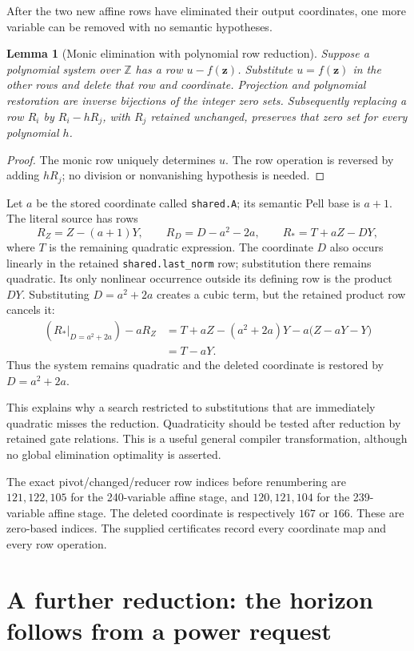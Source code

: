 \documentclass[11pt]{article}
\newcommand{\Z}{\mathbb Z}
\newcommand{\file}[1]{\nolinkurl{#1}}
\newtheorem{lemma}[theorem]{Lemma}
\theoremstyle{remark}\newtheorem{remark}[theorem]{Remark}
\begin{document}
After the two new affine rows have eliminated their output coordinates,
one more variable can be removed with no semantic hypotheses.

\begin{lemma}[Monic elimination with polynomial row reduction]\label{lem:elim}
Suppose a polynomial system over $\Z$ has a row $u-f(\mathbf z)$.
Substitute $u=f(\mathbf z)$ in the other rows and delete that row
and coordinate. Projection and polynomial restoration are inverse
bijections of the integer zero sets. Subsequently replacing a row
$R_i$ by $R_i-hR_j$, with $R_j$ retained unchanged, preserves that
zero set for every polynomial $h$.
\end{lemma}
\begin{proof}
The monic row uniquely determines $u$. The row operation is reversed
by adding $hR_j$; no division or nonvanishing hypothesis is needed.
\end{proof}

Let $a$ be the stored coordinate called \file{shared.A}; its semantic
Pell base is $a+1$. The literal source has rows
\[
 R_Z=Z-(a+1)Y,
 \qquad R_D=D-a^2-2a,
 \qquad R_*=T+aZ-DY,
\]
where $T$ is the remaining quadratic expression. The coordinate $D$
also occurs linearly in the retained \file{shared.last_norm} row;
substitution there remains quadratic. Its only nonlinear occurrence
outside its defining row is the product $DY$. Substituting $D=a^2+2a$ creates a cubic
term, but the retained product row cancels it:
\begin{align*}
 (R_*|_{D=a^2+2a})-aR_Z
 &=T+aZ-(a^2+2a)Y-a\bigl(Z-aY-Y\bigr)\\
 &=T-aY.
\end{align*}
Thus the system remains quadratic and the deleted coordinate is
restored by $D=a^2+2a$.

This explains why a search restricted to substitutions that are
immediately quadratic misses the reduction. Quadraticity should be
tested after reduction by retained gate relations. This is a useful
general compiler transformation, although no global elimination
optimality is asserted.

The exact pivot/changed/reducer row indices before renumbering are
$121,122,105$ for the 240-variable affine stage, and $120,121,104$
for the 239-variable affine stage. The deleted coordinate is respectively
$167$ or $166$. These are zero-based indices. The supplied certificates
record every coordinate map and every row operation.

\section{A further reduction: the horizon follows from a power request}\label{sec:horizon}
\end{document}
